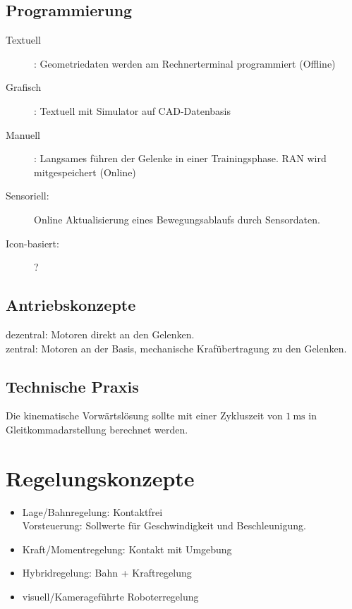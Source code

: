 \documentclass[6pt,a4paper]{scrartcl}
\begin{document}
\begin{multicols}{4}
\subsection{Programmierung}
\begin{description}
	\item[Textuell]: Geometriedaten werden am Rechnerterminal programmiert (Offline)
	\item[Grafisch]: Textuell mit Simulator auf CAD-Datenbasis
	\item[Manuell]: Langsames führen der Gelenke in einer Trainingsphase. RAN wird mitgespeichert (Online)
	\item[Sensoriell:] Online Aktualisierung eines Bewegungsablaufs durch Sensordaten.
	\item[Icon-basiert:] ?

\end{description}

\subsection{Antriebskonzepte}
dezentral: Motoren direkt an den Gelenken.\\
zentral: Motoren an der Basis, mechanische Krafübertragung zu den Gelenken.\\

\subsection{Technische Praxis}
Die kinematische Vorwärtslösung sollte mit einer Zykluszeit von $\SI{1}{\milli\second}$ in Gleitkommadarstellung berechnet werden.



\section{Regelungskonzepte}
\begin{itemize}
	\item Lage/Bahnregelung: Kontaktfrei\\
		Vorsteuerung: Sollwerte für Geschwindigkeit und Beschleunigung.
	\item Kraft/Momentregelung: Kontakt mit Umgebung
	\item Hybridregelung: Bahn + Kraftregelung
	\item visuell/Kamerageführte Roboterregelung
\end{itemize}




\end{multicols}
\end{document}
